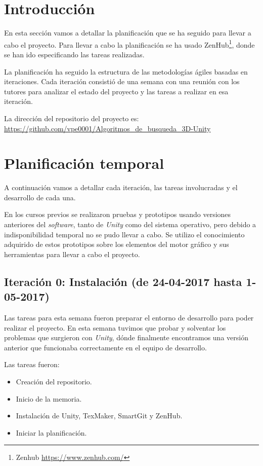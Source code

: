 
\section{Introducción}
En esta sección vamos a detallar la planificación que se ha seguido para llevar a cabo el proyecto. Para llevar a cabo la planificación se ha usado ZenHub\footnote{Zenhub \url{https://www.zenhub.com/}}, donde se han ido especificando las tareas realizadas.

La planificación ha seguido la estructura de las metodologías ágiles basadas en iteraciones. Cada iteración consistió de una semana con una reunión con los tutores para analizar el estado del proyecto y las tareas a realizar en esa iteración.

La dirección del repositorio del proyecto es:
\url{https://github.com/vpe0001/Algoritmos_de_busqueda_3D-Unity}

\section{Planificación temporal}
A continuación vamos a detallar cada iteración, las tareas involucradas y el desarrollo de cada una.

En los cursos previos se realizaron pruebas y prototipos usando versiones anteriores del \textit{software}, tanto de \textit{Unity} como del sistema operativo, pero debido a indisponibilidad temporal no se pudo llevar a cabo. Se utilizo el conocimiento adquirido de estos prototipos sobre los elementos del motor gráfico y sus herramientas para llevar a cabo el proyecto.

\newpage
\subsection{Iteración 0: Instalación (de 24-04-2017 hasta 1-05-2017) }
Las tareas para esta semana fueron preparar el entorno de desarrollo para poder realizar el proyecto. En esta semana tuvimos que probar y solventar los problemas que surgieron con \textit{Unity}, dónde finalmente encontramos una versión anterior que funcionaba correctamente en el equipo de desarrollo.

Las tareas fueron:
\begin{itemize}
\item Creación del repositorio.
\item Inicio de la memoria.
\item Instalación de Unity, TexMaker, SmartGit y ZenHub.
\item Iniciar la planificación.
\end{itemize}

